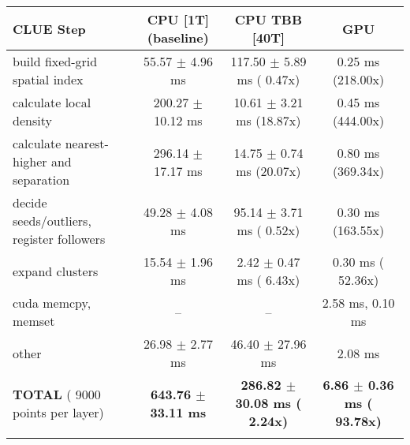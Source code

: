     \begin{tabular}{l|c|c|c}
    \hline
    CLUE Step                                 & CPU [1T] (baseline)         & CPU TBB [40T]                         & GPU                       \\ \hline
    build fixed-grid spatial index            &  55.57 $\pm$  4.96 ms       & 117.50 $\pm$  5.89 ms ( 0.47x)        &   0.25 ms (218.00x)       \\
    calculate local density                   & 200.27 $\pm$ 10.12 ms       &  10.61 $\pm$  3.21 ms (18.87x)        &   0.45 ms (444.00x)       \\
    calculate nearest-higher and separation   & 296.14 $\pm$ 17.17 ms       &  14.75 $\pm$  0.74 ms (20.07x)        &   0.80 ms (369.34x)       \\
    decide seeds/outliers, register followers &  49.28 $\pm$  4.08 ms       &  95.14 $\pm$  3.71 ms ( 0.52x)        &   0.30 ms (163.55x)       \\
    expand clusters                           &  15.54 $\pm$  1.96 ms       &   2.42 $\pm$  0.47 ms ( 6.43x)        &   0.30 ms ( 52.36x)       \\ \hline
    cuda memcpy, memset                       & --                          & --                                    &   2.58 ms,   0.10 ms      \\ 
    other                                     &  26.98 $\pm$  2.77 ms       &  46.40 $\pm$ 27.96 ms                 &   2.08 ms                 \\ \hline
    \textbf{TOTAL} ( 9000 points per layer)   & \textbf{643.76 $\pm$ 33.11 ms} & \textbf{286.82 $\pm$ 30.08 ms ( 2.24x)} & \textbf{  6.86 $\pm$  0.36 ms ( 93.78x)}  \\
    \hline
    \multicolumn{4}{c}{} 
    \end{tabular}
    \linebreak


